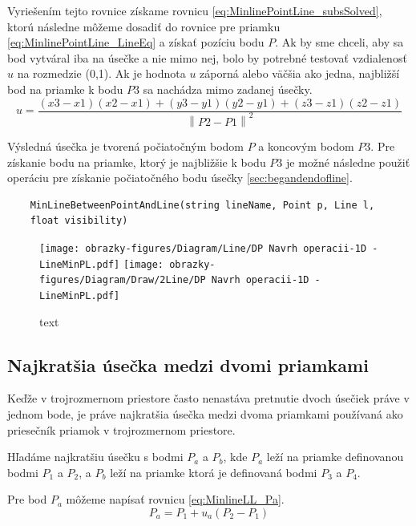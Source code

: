 Vyriešením tejto rovnice získame rovnicu \ref{eq:MinlinePointLine_subsSolved}, ktorú následne môžeme dosadiť do rovnice pre priamku \ref{eq:MinlinePointLine_LineEq} a získať pozíciu bodu $P$. Ak by sme chceli, aby sa bod vytváral iba na úsečke a nie mimo nej, bolo by potrebné testovať vzdialenosť $u$ na rozmedzie (0,1). Ak je hodnota $u$ záporná alebo väčšia ako jedna,  najbližší bod na priamke k bodu $P3$ sa nachádza mimo zadanej úsečky. 
\begin{equation}
u= \frac
{\left (x3 -x1  \right )\left (x2-x1  \right )
+\left (y3-y1  \right )\left (y2-y1  \right )
+\left (z3-z1  \right )\left (z2-z1  \right )}
{\left \| P2-P1 \right \|^{2}}
    \label{eq:MinlinePointLine_subsSolved}
\end{equation}


Výsledná úsečka je tvorená počiatočným bodom $P$ a koncovým bodom $P3$.
Pre získanie bodu na priamke, ktorý je najbližšie k bodu $P3$ je možné následne použiť operáciu pre získanie počiatočného bodu úsečky \ref{sec:begandendofline}.


\begin{lstlisting}
	MinLineBetweenPointAndLine(string lineName, Point p, Line l,
	float visibility)
\end{lstlisting}

\begin{figure}[H]
	\centering
	\texttt{[image: obrazky-figures/Diagram/Line/DP Navrh operacii-1D -  LineMinPL.pdf]}
	\texttt{[image: obrazky-figures/Diagram/Draw/2Line/DP Navrh operacii-1D -  LineMinPL.pdf]}
	\caption{text}
	\label{fig:1}
\end{figure}

\subsection{Najkratšia úsečka medzi dvomi priamkami}
Keďže v trojrozmernom priestore často nenastáva pretnutie dvoch úsečiek práve v jednom bode, je práve najkratšia úsečka medzi dvoma priamkami používaná ako priesečník priamok v trojrozmernom priestore.


Hľadáme najkratšiu úsečku s bodmi $P_a$ a $P_b$, kde $P_a$ leží na priamke definovanou bodmi $P_1$ a $P_2$, a $P_b$ leží na priamke ktorá je definovaná bodmi $P_3$ a $P_4$.

Pre bod $P_a$ môžeme napísať rovnicu  \ref{eq:MinlineLL_Pa}.
\begin{equation}
P_a=P_1 + u_a(P_2-P_1)
    \label{eq:MinlineLL_Pa}
\end{equation}

